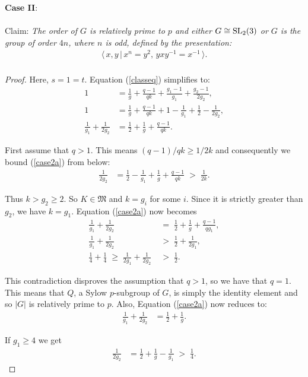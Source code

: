 \textbf{Case II}:\\
\\
Claim: \textit{The order of $G$ is relatively prime to $p$ and either $G \cong \operatorname{SL}_2(3)$ or $G$ is the group of order $4n$, where $n$ is odd, defined by the presentation:}
\begin{align*} \langle \, x,y \, | \, x^n = y^2, \, yxy^{-1} = x^{-1} \, \rangle. \\
\end{align*}
\begin{proof} Here, $s = 1 = t$. Equation (\ref{classeq}) simplifies to:
\begin{align}\label{case2a} 1 &= \frac{1}{g} + \frac{q-1}{qk} + \frac{g_1-1}{g_1} +  \frac{g_2-1}{2g_2}, \nonumber
\\ 1 &= \frac{1}{g} + \frac{q-1}{qk} + 1 - \frac{1}{g_1} + \frac{1}{2} - \frac{1}{2g_2}, \nonumber
\\ \frac{1}{g_1}  + \frac{1}{2g_2} &= \frac{1}{2} + \frac{1}{g} + \frac{q-1}{qk}.
\end{align}

First assume that $q>1$. This means $(q-1)/qk \geq 1/2k$ and consequently we bound (\ref{case2a}) from below:
\begin{align*} \frac{1}{2g_2} &= \frac{1}{2} - \frac{1}{g_1} + \frac{1}{g} + \frac{q-1}{qk} \; > \; \frac{1}{2k}.
\end{align*}

Thus $k > g_2 \geq 2$. So $K \in \mathfrak{M}$ and $k=g_i$ for some $i$. Since it is strictly greater than $g_2$, we have $k=g_1$. Equation (\ref{case2a}) now becomes
\begin{align*} \frac{1}{g_1}  + \frac{1}{2g_2} \; &= \; \frac{1}{2} + \frac{1}{g} + \frac{q-1}{qg_1},
\\ \frac{1}{g_1}  + \frac{1}{2g_2} \; &> \; \frac{1}{2} + \frac{1}{2g_1},
\\ \frac{1}{4} + \frac{1}{4} \; \geq \; \frac{1}{2g_1}  + \frac{1}{2g_2} \; &> \; \frac{1}{2}.
\end{align*}

This contradiction disproves the assumption that $q > 1$, so we have that $q = 1$. This means that $Q$, a Sylow $p$-subgroup of $G$, is simply the identity element and so $|G|$ is relatively prime to $p$. Also, Equation (\ref{case2a}) now reduces to:
\begin{align}\label{case2b} \frac{1}{g_1}  + \frac{1}{2g_2} &= \frac{1}{2} + \frac{1}{g}.
\end{align}

If $g_1 \geq 4$ we get
\begin{align*} \frac{1}{2g_2} &= \frac{1}{2} + \frac{1}{g} - \frac{1}{g_1} \; > \; \frac{1}{4}.
\end{align*}


\end{proof}
